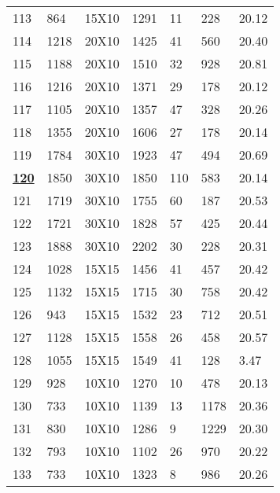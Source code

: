 \documentclass[14pt]{acmsiggraph}
\begin{document}
\begin{table}[h!]
\begin{center}
{\begin{tabular}{||lllllll}
					113 & 864  & 15X10  & \cellcolor[rgb]{0.99,0.91,0.51}1291 & 11  & 228  & 20.12 \\
					114 & 1218 & 20X10  & \cellcolor[rgb]{0.62,0.76,0.35}1425 & 41  & 560  & 20.40 \\
					115 & 1188 & 20X10  & \cellcolor[rgb]{0.74,0.8,0.4}1510   & 32  & 928  & 20.81 \\
					116 & 1216 & 20X10  & \cellcolor[rgb]{0.58,0.73,0.33}1371 & 29  & 178  & 20.12 \\
					117 & 1105 & 20X10  & \cellcolor[rgb]{0.69,0.78,0.38}1357 & 47  & 328  & 20.26 \\
					118 & 1355 & 20X10  & \cellcolor[rgb]{0.64,0.76,0.36}1606 & 27  & 178  & 20.14 \\
					119 & 1784 & 30X10  & \cellcolor[rgb]{0.52,0.71,0.31}1923 & 47  & 494  & 20.69 \\
					\underline{\textbf{120}} & 1850 & 30X10  & \cellcolor[rgb]{0.43,0.67,0.27}1850 & 110 & 583  & 20.14 \\
					121 & 1719 & 30X10  & \cellcolor[rgb]{0.45,0.68,0.28}1755 & 60  & 187  & 20.53 \\
					122 & 1721 & 30X10  & \cellcolor[rgb]{0.5,0.7,0.3}1828    & 57  & 425  & 20.44 \\
					123 & 1888 & 30X10  & \cellcolor[rgb]{0.62,0.75,0.35}2202 & 30  & 228  & 20.31 \\
					124 & 1028 & 15X15  & \cellcolor[rgb]{0.9,0.87,0.47}1456  & 41  & 457  & 20.42 \\
					125 & 1132 & 15X15  & \cellcolor[rgb]{1,0.89,0.5}1715     & 30  & 758  & 20.42 \\
					126 & 943  & 15X15  & \cellcolor[rgb]{1,0.69,0.39}1532    & 23  & 712  & 20.51 \\
					127 & 1128 & 15X15  & \cellcolor[rgb]{0.86,0.86,0.45}1558 & 26  & 458  & 20.57 \\
					128 & 1055 & 15X15  & \cellcolor[rgb]{0.96,0.9,0.5}1549   & 41  & 128  & 3.47  \\
					129 & 928  & 10X10  & \cellcolor[rgb]{0.85,0.85,0.45}1270 & 10  & 478  & 20.13 \\
					130 & 733  & 10X10  & \cellcolor[rgb]{1,0.82,0.46}1139    & 13  & 1178 & 20.36 \\
					131 & 830  & 10X10  & \cellcolor[rgb]{1,0.83,0.46}1286    & 9   & 1229 & 20.30 \\
					132 & 793  & 10X10  & \cellcolor[rgb]{0.87,0.86,0.46}1102 & 26  & 970  & 20.22 \\
					133 & 733  & 10X10  & \cellcolor[rgb]{1,0.36,0.2}1323     & 8   & 986  & 20.26 \\

\end{tabular}}
\end{center}
\end{table}
\end{document}
